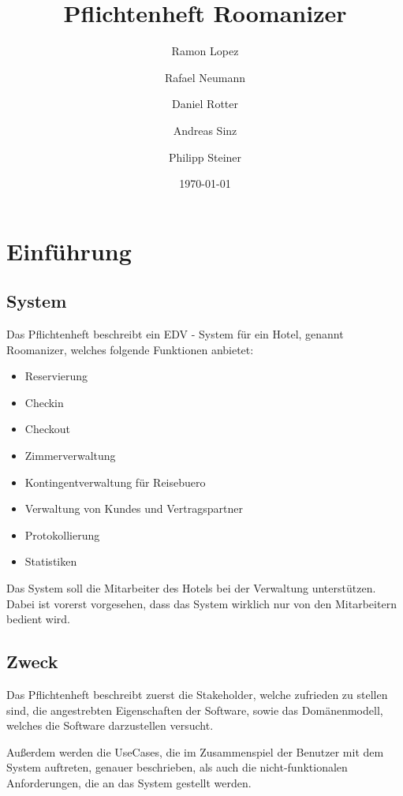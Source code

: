 \documentclass[10pt,a4paper,titlepage]{article}
\begin{document}
\fancyhf{}

\lhead{\leftmark}

\setcounter{secnumdepth}{5}
\setcounter{tocdepth}{3}

\title{Pflichtenheft Roomanizer}
\author{Ramon Lopez \and Rafael Neumann \and Daniel Rotter \and Andreas Sinz \and Philipp Steiner}
\date{\today}
\maketitle

\tableofcontents
\newpage
\section{Einführung}
\subsection{System}
Das Pflichtenheft beschreibt ein EDV - System für ein Hotel, genannt Roomanizer, welches 
folgende Funktionen anbietet:
\begin{itemize}
	\item \Gls{Reservierung}
	\item \Gls{Checkin}
	\item \Gls{Checkout}
	\item Zimmerverwaltung
	\item Kontingentverwaltung für \Gls{Reisebuero}
	\item Verwaltung von \Glspl{Kunde} und \Gls{Vertragspartner}
	\item Protokollierung
	\item Statistiken
\end{itemize}
Das System soll die \Gls{Mitarbeiter} des Hotels bei der Verwaltung unterstützen. Dabei ist vorerst vorgesehen, dass das System wirklich nur von den \Gls{Mitarbeiter}n bedient wird.
\subsection{Zweck}
Das Pflichtenheft beschreibt zuerst die Stakeholder, welche zufrieden zu stellen sind, die angestrebten Eigenschaften der Software, sowie das Domänenmodell, welches die Software darzustellen versucht. 

Außerdem werden die UseCases, die im Zusammenspiel der Benutzer mit dem System auftreten, genauer beschrieben, als auch die nicht-funktionalen Anforderungen, die an das System gestellt werden.
\end{document}
